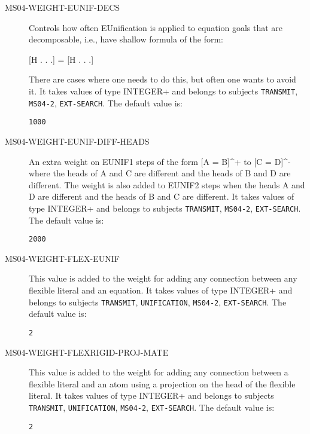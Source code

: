 \begin{description}
\item[MS04-WEIGHT-EUNIF-DECS]  
Controls how often EUnification is applied to equation goals that are
decomposable, i.e., have shallow formula of the form:

     [H . . .] = [H . . .]

There are cases where one needs to do this, but often one wants to avoid it.
It takes values of type INTEGER+ and belongs to subjects \texttt{TRANSMIT}, \texttt{MS04-2}, \texttt{EXT-SEARCH}.  The default value is: \begin{lstlisting}
1000
\end{lstlisting}

\item[MS04-WEIGHT-EUNIF-DIFF-HEADS]  
An extra weight on EUNIF1 steps of the form [A = B]\textasciicircum + to [C = D]\textasciicircum -
where the heads of A and C are different and the heads of B and D
are different.  The weight is also added to EUNIF2 steps when the
heads A and D are different and the heads of B and C are different.
It takes values of type INTEGER+ and belongs to subjects \texttt{TRANSMIT}, \texttt{MS04-2}, \texttt{EXT-SEARCH}.  The default value is: \begin{lstlisting}
2000
\end{lstlisting}

\item[MS04-WEIGHT-FLEX-EUNIF]  
This value is added to the weight for adding any connection between
any flexible literal and an equation.
It takes values of type INTEGER+ and belongs to subjects \texttt{TRANSMIT}, \texttt{UNIFICATION}, \texttt{MS04-2}, \texttt{EXT-SEARCH}.  The default value is: \begin{lstlisting}
2
\end{lstlisting}

\item[MS04-WEIGHT-FLEXRIGID-PROJ-MATE]  
This value is added to the weight for adding any connection between a
flexible literal and an atom using a projection on the head of the
flexible literal.
It takes values of type INTEGER+ and belongs to subjects \texttt{TRANSMIT}, \texttt{UNIFICATION}, \texttt{MS04-2}, \texttt{EXT-SEARCH}.  The default value is: \begin{lstlisting}
2
\end{lstlisting}


\end{description}
